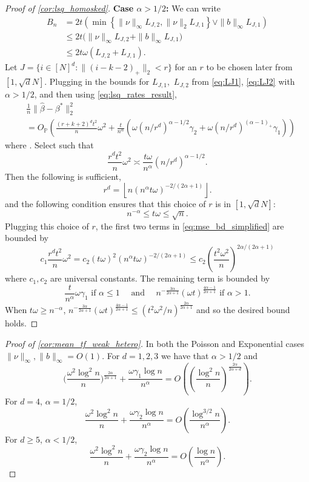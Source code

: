 \documentclass[ejs,noshowframe]{imsart}
\theoremstyle{plain}
\theoremstyle{definition}
\renewcommand{\P}{\mathbb{P}}
\newcommand{\snorm}[1]{\lVert #1 \rVert}
\renewcommand{\hat}{\widehat}
\begin{document}
\begin{appendix}
\begin{proof}[Proof of \autoref{cor:lsq_homosked}]
\noindent
\textbf{Case $\alpha > 1/2$:}
We can write
\begin{align}
B_n 
&= 2t\left( 
\min\left\{ \|\nu\|_\infty  L_{J,2}, 
\|\nu\|_2 L_{J,1} \right\}
\vee  \| b \|_\infty L_{J,1}\right) \\
&\leq 2t \big( \| \nu \|_\infty L_{J,2} + \| b \|_\infty L_{J,1} \big)\\
&\leq 2t\omega (L_{J,2} + L_{J,1}).
\end{align}
Let $J = \{ i \in [N]^d : \| (i-k-2)_+\|_2 < r \}$ for an $r$ to be 
chosen later from $[1, \sqrt{d} N]$.
Plugging in the bounds for $L_{J,1},$ $L_{J,2}$ from \eqref{eq:LJ1}, 
\eqref{eq:LJ2} with $\alpha > 1/2$, and then using 
\eqref{eq:lsq_rates_result},
	\begin{align}
		&\frac{1}{n}\snorm{ \hat\beta - \beta^* }_2^2\label{eq:mse_bd_simplified}\\
		& = O_\P \left( \frac{(r+k+2)^d 
		t^2}{n} 
		\omega^2 +\frac{t}{n^\alpha} \left( \omega 
		(n/r^d)^{\alpha-1/2}\gamma_2 + 
		\omega (n/r^d)^{(\alpha-1)_+} \gamma_1 \right) \right)
		\nonumber
	\end{align}
	where .
 Select  such that
	\[
	\frac{r^d t^2}{n} \omega^2 \asymp \frac{t \omega}{n^\alpha} 
	(n/r^d)^{\alpha-1/2}.
	\]
	Then the following is sufficient,
	\[
	r^d = \left\lfloor n (n^\alpha t \omega)^{-2/(2\alpha + 1)} \right \rfloor.
	\]
and the following condition ensures that this choice of $r$ is in $[1, \sqrt{d} 
N]$:
	\[
	n^{-\alpha} \le t \omega \le \sqrt n.
	\]
	Plugging this choice of $r$, the first two terms in 
	\eqref{eq:mse_bd_simplified} are bounded by
	\[
	c_1 \frac{r^d t^2}{n} \omega^2 = c_2 (t \omega)^2 (n^\alpha t 
	\omega)^{-2/(2\alpha + 1)} \le c_2 \left(\frac{t^2 \omega^2}{n} 
	\right)^{2\alpha/(2\alpha+1)}
	\]
	where $c_1, c_2$ are universal constants.
	The remaining term is bounded by
	\[
	\frac{t}{n^\alpha} \omega \gamma_1 \textrm{ if }  \alpha \le 1 \quad \textrm{ 
		and } \quad
	n^{-\frac{3 \alpha}{2 \alpha + 1}} (\omega t)^{\frac{4 \alpha - 1}{2 \alpha 
			+1}} \textrm{ if } \alpha > 1.
	\]
	When $t\omega \geq n^{-\alpha}$, 
	$n^{-\frac{3 \alpha}{2 \alpha + 1}} 
		(\omega t)^{\frac{4 \alpha - 1}{2 \alpha +1}} 
	\leq (t^2\omega^2/n)^\frac{2\alpha}{2\alpha+1}$ 
	and so the desired bound holds. \hfill\qedhere
\end{proof}


\begin{proof}[Proof of \autoref{cor:mean_tf_weak_hetero}]
  In both the Poisson and Exponential cases $\| \nu \|_\infty, \| b \|_\infty = O(1)$.
  For $d = 1,2,3$ we have that $\alpha > 1/2$ and 
  \[
    \Big(\frac{\omega^2  \log^2 n}{n} \Big)^{\frac{2\alpha}{2\alpha +1}} + \frac{\omega\gamma_1 \log n}{n^\alpha} = O\left( \left( \frac{\log^2 n}{n} \right)^{\frac{2 \alpha}{2 \alpha + d}} \right).
  \]
  For $d = 4$, $\alpha = 1/2$,
  \[
    \frac{\omega^2 \log^2 n}{n} + \frac{\omega\gamma_2 \log n}{n^\alpha} = O\left( \frac{\log^{3/2} n}{n^\alpha} \right).
  \]
  For $d \ge 5$, $\alpha < 1/2$,
  \[
    \frac{\omega^2 \log^2 n}{n} + \frac{\omega\gamma_2 \log n}{n^\alpha} = O\left( 
      \frac{\log n}{n^\alpha} \right).
  \]


\end{proof}
\end{appendix}
\end{document}
